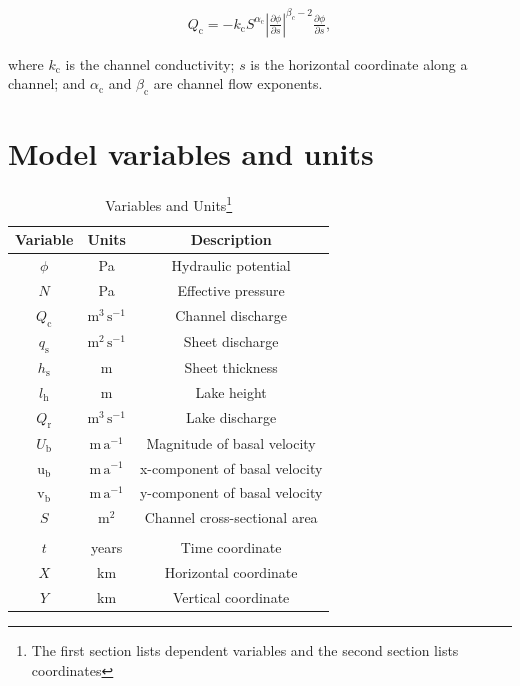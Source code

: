 \documentclass[tc, manuscript]{copernicus}
\providecommand{\DIFadd}[1]{{\protect\color{blue}\uwave{#1}}} %
\providecommand{\DIFdel}[1]{{\protect\color{red}\sout{#1}}} %
\providecommand{\DIFdelbegin}{} %
\providecommand{\DIFdelend}{} %
\providecommand{\DIFaddFL}[1]{\DIFadd{#1}} %
\providecommand{\DIFdelFL}[1]{\DIFdel{#1}} %
\providecommand{\DIFaddbeginFL}{} %
\providecommand{\DIFaddendFL}{} %
\providecommand{\DIFdelbeginFL}{} %
\providecommand{\DIFdelendFL}{} %
\begin{document}
\begin{equation}
\label{appeqn: Qc}
\begin{aligned}
Q_{\mathrm{c}} = -k_{\mathrm{c}}S^{\alpha_{\mathrm{c}}}\left|\frac{\partial \phi}{\partial s}\right|^{\beta_{c}-2}\frac{\partial \phi}{\partial s},
\end{aligned}
\end{equation}

where $k_{\mathrm{c}}$ is the channel conductivity; $s$ is the horizontal coordinate along a channel; and $\alpha_{\mathrm{c}}$ and $\beta_{\mathrm{c}}$ are channel flow exponents.

\DIFdelbegin %
\DIFdelend %
\section{Model variables and units}

\begin{table}[h!]
\caption{Variables and Units\footnote{The first section lists dependent variables and the second section lists coordinates}}

 \label{tab:Var}
\begin{tabular}{@{}ccc}
\hline
Variable & Units & Description \\
\hline
$\phi$ & Pa & Hydraulic potential \\
$N$ & Pa & Effective pressure \\
$Q_{\mathrm{c}}$ & $\mathrm{m}^{3}\, \mathrm{s}^{-1}$ & Channel discharge \\
\DIFdelbeginFL \DIFdelFL{$q_{\mathrm{s}}$ }\DIFdelendFL \DIFaddbeginFL \DIFaddFL{$\mathbf{q}_{\mathrm{s}}$ }\DIFaddendFL & $\mathrm{m}^{2}\,\mathrm{s}^{-1}$ & Sheet discharge \\
$h_{\mathrm{s}}$ & m & Sheet thickness \\
$l_{\mathrm{h}}$ & m & Lake height \\
$Q_{\mathrm{r}}$ & $\mathrm{m}^{3}\, \mathrm{s}^{-1}$ & Lake discharge \\
$U_{\mathrm{b}}$ & $\mathrm{m\,a}^{-1}$ & Magnitude of basal velocity\\
$\mathrm{u}_{\mathrm{b}}$ & $\mathrm{m\,a}^{-1}$ & x-component of basal velocity \\
$\mathrm{v}_{\mathrm{b}}$ & $\mathrm{m\,a}^{-1}$ & y-component of basal velocity \\
$S$ & $\mathrm{m}^2$ & Channel cross-sectional area \\
\hfill \\
$t$ & years & Time coordinate \\
$X$ & km & Horizontal coordinate \\
$Y$ & km & Vertical coordinate \\

\hline
\end{tabular}
\end{table}
\end{document}
